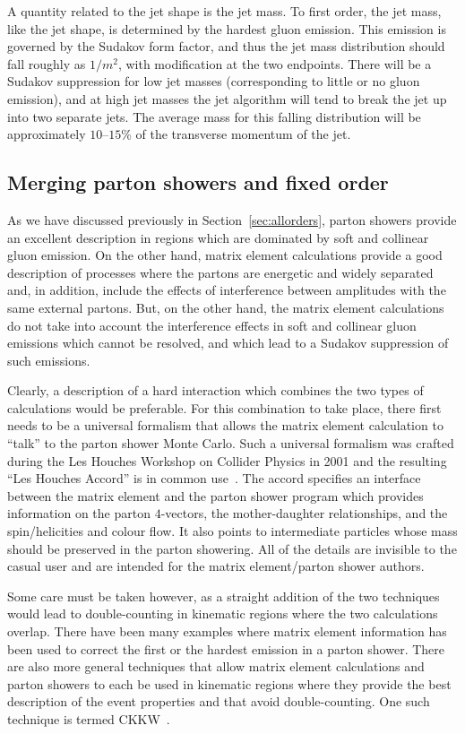 \documentclass[12pt]{iopart}
\begin{document}
A quantity related to the jet shape is the jet mass. To first order, the jet mass, like the jet shape, is
determined by the hardest gluon emission. This emission is governed by the Sudakov form factor, and thus
the jet mass distribution should fall roughly as $1/m^2$, with modification at the two endpoints. There will be
a Sudakov suppression for low jet masses (corresponding to little or no gluon emission), and at high jet masses
the jet algorithm will tend to break the jet up into two separate jets. The average mass for this falling
distribution will be approximately $10$--$15$\% of the transverse momentum of the jet. 

\subsection{Merging parton showers and fixed order}
\label{sec:merge}

As we have discussed previously in Section~\ref{sec:allorders}, parton showers provide an excellent
description in regions which are dominated by soft and collinear gluon emission.
On the other hand, matrix element calculations provide a good description of processes 
where the partons are energetic and widely separated and, in addition, include the effects 
of interference between amplitudes with the same external partons. But, on the other hand, 
the matrix element calculations do not take into account the interference effects in soft 
and collinear gluon emissions which cannot be resolved, and  which lead to a Sudakov 
suppression of such emissions.  

Clearly, a description of a hard interaction which combines the two types of calculations would be
preferable. For this combination to take place, there first needs to be  a universal formalism that
allows the matrix element calculation to ``talk'' to the parton shower Monte Carlo. Such a universal
formalism was crafted during the Les Houches Workshop on Collider Physics in 2001 and the resulting
``Les Houches Accord'' is in common use~\cite{Boos:2001cv}.  The accord specifies an interface between
the matrix element and the parton shower program which provides information on the parton
$4$-vectors, the mother-daughter relationships, and the spin/helicities and colour flow. It also points
to intermediate particles whose mass should be preserved in the parton showering. All of the details
are invisible to the casual user and are intended for the matrix element/parton shower authors.

Some care must be taken however,  as a straight addition of the two techniques would lead to
double-counting in kinematic regions where the two calculations overlap. There have been many examples
where matrix element information has been used to correct the first or the hardest emission in a
parton shower. There are also more general techniques that allow  matrix element calculations and
parton showers  to each be used in kinematic regions where they provide the best description of the
event properties and that avoid double-counting. One such technique is  termed
CKKW~\cite{Catani:2001cc}.
\end{document}
